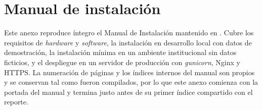 \section{Manual de instalación}\label{apx:manual-instalacion}
\justifying

Este anexo reproduce íntegro el Manual de Instalación mantenido en . Cubre los requisitos de \emph{hardware} y \emph{software}, la instalación en desarrollo local con datos de demostración, la instalación mínima en un ambiente institucional sin datos ficticios, y el despliegue en un servidor de producción con \emph{gunicorn}, Nginx y HTTPS. La numeración de páginas y los índices internos del manual son propios y se conservan tal como fueron compilados, por lo que este anexo comienza con la portada del manual y termina justo antes de su primer índice compartido con el reporte.



